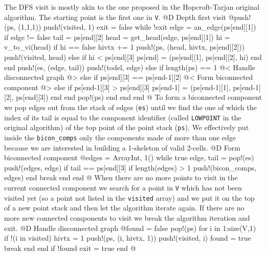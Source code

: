 \documentclass[10pt,oneside]{article}
\begin{document}
The DFS visit is mostly akin to the one proposed in the Hopcroft-Tarjan original algorithm.
The starting point is the first one in \texttt{V}.
@D Depth first visit
@{push!(ps, (1,1,1))
push!(visited, 1)
exit = false
while !exit
    edge = an_edge(ps[end][1])
    if edge != false
        tail = ps[end][2]
        head = get_head(edge, ps[end][1])
        hi = v_to_vi(head)
        if hi == false
            hivtx += 1
            push!(ps, (head, hivtx, ps[end][2]))
            push!(visited, head)
        else
            if hi < ps[end][3]
                ps[end] = (ps[end][1], ps[end][2], hi)
            end
        end
        push!(es, (edge, tail))
        push!(todel, edge)
    else
        if length(ps) == 1
            @< Handle disconnected graph @>
        else
            if ps[end][3] == ps[end-1][2]
                @< Form biconnected component @>
            else
                if ps[end-1][3] > ps[end][3]
                    ps[end-1] = (ps[end-1][1], ps[end-1][2], ps[end][3])
                end
            end
            pop!(ps)
        end
    end
end
@}
To form a biconnected component we pop edges out from the stack of edges (\texttt{es}) until we find the one
of which the index of its tail is equal to the component identifier (called \texttt{LOWPOINT} in the original algorithm) 
of the top point of the point stack (\texttt{ps}). We effectively put inside the \texttt{bicon\_comps} only the components
made of more than one edge because we are interested in building a 1-skeleton of valid 2-cells.
@D Form biconnected component
@{edges = Array{Int, 1}()
while true
    edge, tail = pop!(es)
    push!(edges, edge)
    if tail == ps[end][3]
        if length(edges) > 1
            push!(bicon_comps, edges)
        end
        break
    end
end
@}
When there are no more points to visit in the current connected component we search for a point in \texttt{V}
which has not been visited yet (so a point not listed in the \texttt{visited} array) and we put it on the top
of a new point stack and then let the algorithm iterate again. If there are no more new connected components 
to visit we break the algorithm iteration and exit.
@D Handle disconnected graph
@{found = false
pop!(ps)
for i in 1:size(V,1)
    if !(i in visited)
        hivtx = 1
        push!(ps, (i, hivtx, 1))
        push!(visited, i)
        found = true
        break
    end
end
if !found
    exit = true
end
@}
\end{document}
